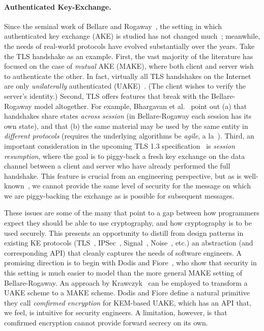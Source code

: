 \paragraph{Authenticated Key-Exchange. }
%
%
Since the seminal work of Bellare and Rogaway~\cite{BR93}, the setting in which
authenticated key exchange (AKE) is studied has not changed
much~; meanwhile, the needs of
real-world protocols have evolved substantially over the years. Take the TLS
handshake  as an example.
%
First, the vast majority of the literature has focused on the case of
\emph{mutual} AKE (MAKE), where both client and server wish to authenticate
the other. In fact, virtually all TLS handshakes on the Internet are only
\emph{unilaterally} authenticated (UAKE)~\cite{xxx}. (The client wishes to
verify the server's identity.)
%
Second, TLS offers features that break with the Bellare-Rogaway model
altogether. For example, Bhargavan et al.~\cite{bhargavan2014proving} point
out (a) that handshakes share states \emph{across session} (in
Bellare-Rogaway each session has its own state), and that (b) the same
material may be used by the same entity in \emph{different protocols}
(requires the underlying algorithms be \emph{agile}, a
la~\cite{acar2010cryptographic}).
%
Third, an important consideration in the upcoming TLS 1.3
specification~\cite{tls13} is \emph{session resumption}, where the goal is
to piggy-back a fresh key exchange on the data channel between a client and
server who have already performed the full handshake. This feature is
crucial from an engineering perspective, but as is well-known~\cite{xxx}, we
cannot provide the same level of security for the message on which we are
piggy-backing the exchange as is possible for subsequent messages.

These issues are some of the many that point to a gap between how programmers
expect they should be able to use cryptography, and how cryptography is to
be used securely. This presents an opportunity to distill from design
patterns in existing KE protocols (TLS~\cite{xxx}, IPSec~\cite{xxx}, Signal~\cite{xxx}, Noise~\cite{xxx}, etc.) an
abstraction (and corresponding API) that cleanly captures the needs of
software engineers.
  A promising direction is to begin with Dodis and
  Fiore~\cite{dodis2017unilateral}, who show that security in this setting is
  much easier to model than the more general MAKE setting of Bellare-Rogaway.
  An approach by Krawczyk~\cite{krawczyk2016unilateral-to-mutual} can be
  employed to transform a UAKE scheme to a MAKE scheme.
  Dodis and Fiore define a natural primitive they call
  \emph{comfirmed encryption} for KEM-based UAKE, which has an API that, we
  feel, is intuitive for security engineers.
  A limitation, however, is that comfirmed encryption cannot provide forward
  secrecy on its own. 

